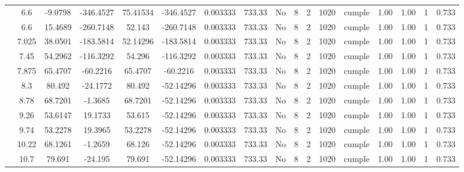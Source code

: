 \begin{table}[H]
{\begin{tabular}{|c|c|c|c|c|c|c|c|c|c|c|c|c|c|c|c|c|}
\cline{2-17}        & \cellcolor[rgb]{ .851,  .882,  .949}6.6 & -9.0798 & -346.4527 & 75.41534 & -346.4527 & 0.003333 & 733.33 & No  & 8   & 2   & 1020 & \cellcolor[rgb]{ .776,  .937,  .808}cumple & 1.00 & 1.00 & 1   & 0.733 \bigstrut\\
\cline{2-17}        & \cellcolor[rgb]{ .851,  .882,  .949}6.6 & 15.4689 & -260.7148 & 52.143 & -260.7148 & 0.003333 & 733.33 & No  & 8   & 2   & 1020 & \cellcolor[rgb]{ .776,  .937,  .808}cumple & 1.00 & 1.00 & 1   & 0.733 \bigstrut\\
\cline{2-17}        & 7.025 & 38.0501 & -183.5814 & 52.14296 & -183.5814 & 0.003333 & 733.33 & No  & 8   & 2   & 1020 & \cellcolor[rgb]{ .776,  .937,  .808}cumple & 1.00 & 1.00 & 1   & 0.733 \bigstrut\\
\cline{2-17}        & 7.45 & 54.2962 & -116.3292 & 54.296 & -116.3292 & 0.003333 & 733.33 & No  & 8   & 2   & 1020 & \cellcolor[rgb]{ .776,  .937,  .808}cumple & 1.00 & 1.00 & 1   & 0.733 \bigstrut\\
\cline{2-17}        & 7.875 & 65.4707 & -60.2216 & 65.4707 & -60.2216 & 0.003333 & 733.33 & No  & 8   & 2   & 1020 & \cellcolor[rgb]{ .776,  .937,  .808}cumple & 1.00 & 1.00 & 1   & 0.733 \bigstrut\\
\cline{2-17}        & 8.3 & 80.492 & -24.1772 & 80.492 & -52.14296 & 0.003333 & 733.33 & No  & 8   & 2   & 1020 & \cellcolor[rgb]{ .776,  .937,  .808}cumple & 1.00 & 1.00 & 1   & 0.733 \bigstrut\\
\cline{2-17}        & 8.78 & 68.7201 & -1.3685 & 68.7201 & -52.14296 & 0.003333 & 733.33 & No  & 8   & 2   & 1020 & \cellcolor[rgb]{ .776,  .937,  .808}cumple & 1.00 & 1.00 & 1   & 0.733 \bigstrut\\
\cline{2-17}        & 9.26 & 53.6147 & 19.1733 & 53.615 & -52.14296 & 0.003333 & 733.33 & No  & 8   & 2   & 1020 & \cellcolor[rgb]{ .776,  .937,  .808}cumple & 1.00 & 1.00 & 1   & 0.733 \bigstrut\\
\cline{2-17}        & 9.74 & 53.2278 & 19.3965 & 53.2278 & -52.14296 & 0.003333 & 733.33 & No  & 8   & 2   & 1020 & \cellcolor[rgb]{ .776,  .937,  .808}cumple & 1.00 & 1.00 & 1   & 0.733 \bigstrut\\
\cline{2-17}        & 10.22 & 68.1261 & -1.2659 & 68.126 & -52.14296 & 0.003333 & 733.33 & No  & 8   & 2   & 1020 & \cellcolor[rgb]{ .776,  .937,  .808}cumple & 1.00 & 1.00 & 1   & 0.733 \bigstrut\\
\cline{2-17}        & 10.7 & 79.691 & -24.195 & 79.691 & -52.14296 & 0.003333 & 733.33 & No  & 8   & 2   & 1020 & \cellcolor[rgb]{ .776,  .937,  .808}cumple & 1.00 & 1.00 & 1   & 0.733 \bigstrut\\

\end{tabular}}
\end{table}
